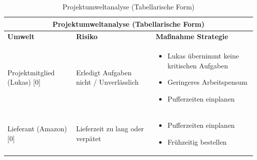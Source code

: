 \begin{table}
    \centering
    \begin{tabular}{lp{}p{}}
        \multicolumn{3}{c}{\textbf{Projektumweltanalyse (Tabellarische Form)}}                                                 \\
        \toprule
        \textbf{Umwelt}             & \textbf{Risiko}                         & \textbf{Maßnahme Strategie}                    \\
        \midrule
        Projektmitglied (Lukas) [0] & Erledigt Aufgaben nicht / Unverlässlich & \begin{itemize}
                                                                                    \item Lukas übernimmt keine kritischen Aufgaben
                                                                                    \item Geringeres Arbeitspensum
                                                                                    \item Pufferzeiten einplanen
                                                                                \end{itemize} \\
        \midrule
        Lieferant (Amazon) [0]      & Lieferzeit zu lang oder verpätet        & \begin{itemize}
                                                                                    \item Pufferzeiten einplanen
                                                                                    \item Frühzeitig bestellen
                                                                                \end{itemize}                    \\
        \bottomrule
    \end{tabular}
    \caption{Projektumweltanalyse (Tabellarische Form)}
    \label{tab:projektumweltanalyse}
\end{table}